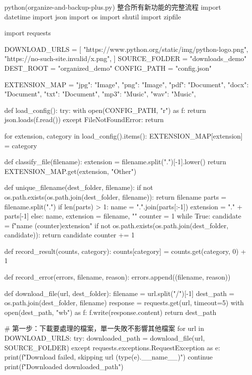 \begin{example}{python}{(organize-and-backup-plus.py) 整合所有新功能的完整流程}
import datetime
import json
import os
import shutil
import zipfile

import requests

DOWNLOAD_URLS = [
    "https://www.python.org/static/img/python-logo.png",
    "https://no-such-site.invalid/x.png",
]
SOURCE_FOLDER = "downloads_demo"
DEST_ROOT = "organized_demo"
CONFIG_PATH = "config.json"

EXTENSION_MAP = {
    "jpg": "Image", "png": "Image",
    "pdf": "Document", "docx": "Document", "txt": "Document",
    "mp3": "Music", "wav": "Music",
}


def load_config():
    try:
        with open(CONFIG_PATH, "r") as f:
            return json.loads(f.read())
    except FileNotFoundError:
        return {}


for extension, category in load_config().items():
    EXTENSION_MAP[extension] = category


def classify_file(filename):
    extension = filename.split(".")[-1].lower()
    return EXTENSION_MAP.get(extension, "Other")


def unique_filename(dest_folder, filename):
    if not os.path.exists(os.path.join(dest_folder, filename)):
        return filename
    parts = filename.split(".")
    if len(parts) > 1:
        name = ".".join(parts[:-1])
        extension = "." + parts[-1]
    else:
        name, extension = filename, ""
    counter = 1
    while True:
        candidate = f"{name} ({counter}){extension}"
        if not os.path.exists(os.path.join(dest_folder, candidate)):
            return candidate
        counter += 1


def record_result(counts, category):
    counts[category] = counts.get(category, 0) + 1


def record_error(errors, filename, reason):
    errors.append((filename, reason))


def download_file(url, dest_folder):
    filename = url.split("/")[-1]
    dest_path = os.path.join(dest_folder, filename)
    response = requests.get(url, timeout=5)
    with open(dest_path, "wb") as f:
        f.write(response.content)
    return dest_path


# 第一步：下載要處理的檔案，單一失敗不影響其他檔案
for url in DOWNLOAD_URLS:
    try:
        downloaded_path = download_file(url, SOURCE_FOLDER)
    except requests.exceptions.RequestException as e:
        print(f"Download failed, skipping {url} ({type(e).__name__})")
        continue
    print(f"Downloaded {downloaded_path}")


\end{example}
